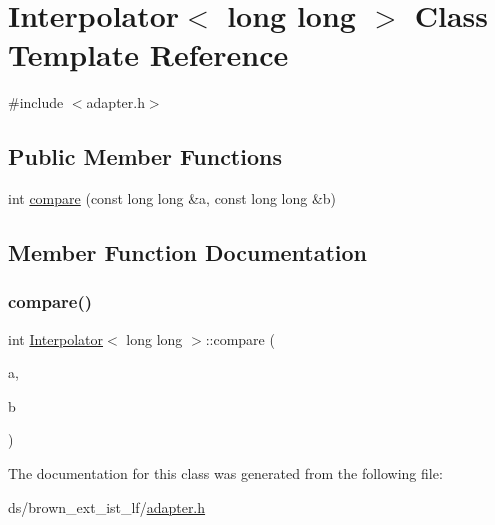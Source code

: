 \hypertarget{classInterpolator_3_01long_01long_01_4}{}\section{Interpolator$<$ long long $>$ Class Template Reference}
\label{classInterpolator_3_01long_01long_01_4}


{\ttfamily \#include $<$adapter.\+h$>$}

\subsection*{Public Member Functions}
\begin{DoxyCompactItemize}
\item 
int \hyperlink{classInterpolator_3_01long_01long_01_4_a68fe5d62882cdaa6924e8cdd110921cd}{compare} (const long long \&a, const long long \&b)
\end{DoxyCompactItemize}


\subsection{Member Function Documentation}
\mbox{\label{classInterpolator_3_01long_01long_01_4_a68fe5d62882cdaa6924e8cdd110921cd}} 
\subsubsection{\texorpdfstring{compare()}{compare()}}
{\footnotesize\ttfamily int \hyperlink{classInterpolator}{Interpolator}$<$ long long $>$\+::compare (\begin{DoxyParamCaption}\item[{const long long \&}]{a,  }\item[{const long long \&}]{b }\end{DoxyParamCaption})\hspace{0.3cm}{\ttfamily [inline]}}



The documentation for this class was generated from the following file\+:\begin{DoxyCompactItemize}
\item 
ds/brown\+\_\+ext\+\_\+ist\+\_\+lf/\hyperlink{brown__ext__ist__lf_2adapter_8h}{adapter.\+h}\end{DoxyCompactItemize}
